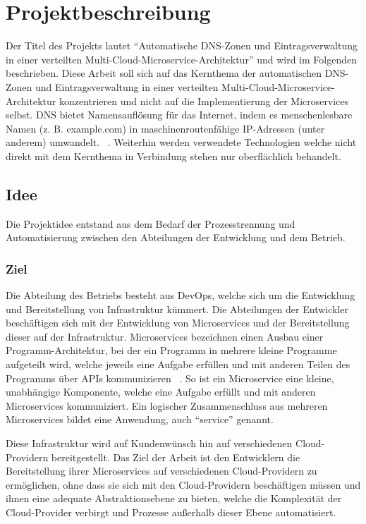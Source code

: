 \chapter{Projektbeschreibung}
\label{ch:description}
Der Titel des Projekts lautet \enquote{Automatische DNS-Zonen und Eintragsverwaltung in einer verteilten Multi-Cloud-Microservice-Architektur} und wird im Folgenden beschrieben.
Diese Arbeit soll sich auf das Kernthema der automatischen DNS-Zonen und Eintragsverwaltung in einer verteilten Multi-Cloud-Microservice-Architektur konzentrieren und nicht auf die Implementierung der Microservices selbst.
\ac{DNS} bietet Namensauflösung für das Internet, indem es menschenlesbare Namen (z. B. example.com) in maschinenroutenfähige IP-Adressen (unter anderem) umwandelt. ~\cite{chung2017understanding}.
Weiterhin werden verwendete Technologien welche nicht direkt mit dem Kernthema in Verbindung stehen nur oberflächlich behandelt.

\section{Idee}
\label{sec:description:projektidee}
Die Projektidee entstand aus dem Bedarf der Prozesstrennung und Automatisierung zwischen den Abteilungen der Entwicklung und dem Betrieb.

\subsection{Ziel}
\label{subsec:description:ziel}
Die Abteilung des Betriebs besteht aus \ac{DevOps}, welche sich um die Entwicklung und Bereitstellung von Infrastruktur kümmert.
Die Abteilungen der Entwickler beschäftigen sich mit der Entwicklung von Microservices und der Bereitstellung dieser auf der Infrastruktur.
Microservices bezeichnen einen Ausbau einer Programm-Architektur, bei der ein Programm in mehrere kleine Programme aufgeteilt wird, welche jeweils eine Aufgabe erfüllen und mit anderen Teilen des Programms über \ac{API}s kommunizieren ~\cite{redhead-kubernetes:2023}.
So ist ein Microservice eine kleine, unabhängige Komponente, welche eine Aufgabe erfüllt und mit anderen Microservices kommuniziert.
Ein logischer Zusammenschluss aus mehreren Microservices bildet eine Anwendung, auch \enquote{service} genannt.
\medskip

Diese Infrastruktur wird auf Kundenwünsch hin auf verschiedenen Cloud-Providern bereitgestellt.
Das Ziel der Arbeit ist den Entwicklern die Bereitstellung ihrer Microservices auf verschiedenen Cloud-Providern zu ermöglichen, ohne dass sie sich mit den Cloud-Providern beschäftigen müssen
und ihnen eine adequate Abstraktionsebene zu bieten, welche die Komplexität der Cloud-Provider verbirgt und Prozesse außerhalb dieser Ebene automatisiert.
\medskip

